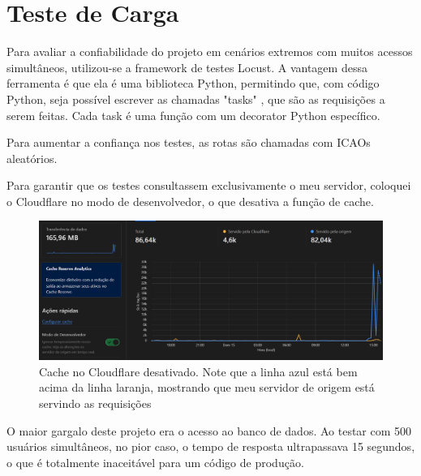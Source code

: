 \chapter{Teste de Carga}

Para avaliar a confiabilidade do projeto em cenários extremos com muitos acessos 
simultâneos, utilizou-se a framework de testes Locust. A vantagem dessa ferramenta 
é que ela é uma biblioteca Python, permitindo que, com código Python, seja possível
escrever as chamadas "tasks" \cite{locust}, que são as requisições a serem feitas.
Cada task é uma função com um decorator Python específico.

Para aumentar a confiança nos testes, as rotas são chamadas com ICAOs aleatórios.

Para garantir que os testes consultassem exclusivamente o meu servidor, coloquei 
o Cloudflare no modo de desenvolvedor, o que desativa a função de cache.

\begin{figure}[ht]
    \begin{center}
    \includegraphics[width=400pt]{img/cloudflare-dev-mode.png}
    \caption{Cache no Cloudflare desativado. Note que a linha azul está bem acima 
    da linha laranja, mostrando que meu servidor de origem está servindo as requisições}
    \label{fig:cloudflare-dev-mode}
    \end{center}
\end{figure}

O maior gargalo deste projeto era o acesso ao banco de dados. Ao testar com 500 
usuários simultâneos, no pior caso, o tempo de resposta ultrapassava 15 segundos, 
o que é totalmente inaceitável para um código de produção.

